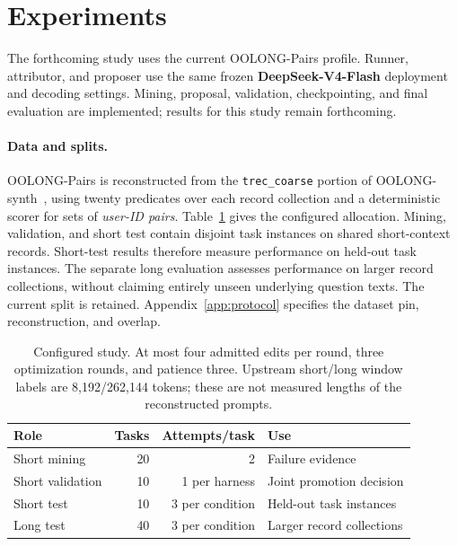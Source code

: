\section{Experiments}
\label{sec:setup}

The forthcoming study uses the current OOLONG-Pairs profile. Runner, attributor,
and proposer use the same frozen \textbf{DeepSeek-V4-Flash} deployment and
decoding settings. Mining, proposal, validation, checkpointing, and final
evaluation are implemented; results for this study remain forthcoming.

\paragraph{Data and splits.}
\label{sec:envs-and-splits}
OOLONG-Pairs is reconstructed from the \texttt{trec\_coarse} portion of
OOLONG-synth~\citep{bertsch2025oolong}, using twenty predicates over each record
collection and a deterministic scorer for sets of \emph{user-ID pairs}.
Table~\ref{tab:study-settings} gives the configured allocation. Mining,
validation, and short test contain disjoint task instances on shared
short-context records. Short-test results therefore measure performance on
held-out task instances. The separate long evaluation assesses performance on
larger record collections, without claiming entirely unseen underlying question
texts. The current split is retained. Appendix~\ref{app:protocol} specifies the
dataset pin, reconstruction, and overlap.

\begin{table}[htbp]
\centering\small
\begin{tabular}{@{}lrrl@{}}
\toprule
Role & Tasks & Attempts/task & Use \\
\midrule
Short mining & 20 & 2 & Failure evidence \\
Short validation & 10 & 1 per harness & Joint promotion decision \\
Short test & 10 & 3 per condition & Held-out task instances \\
Long test & 40 & 3 per condition & Larger record collections \\
\bottomrule
\end{tabular}
\caption{Configured study. At most four admitted edits per round, three
optimization rounds, and patience three. Upstream short/long window labels are
8,192/262,144 tokens; these are not
measured lengths of the reconstructed prompts.}
\label{tab:study-settings}
\end{table}

